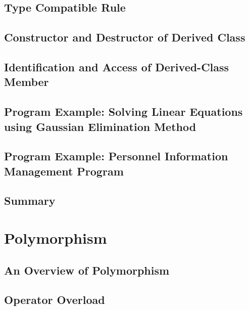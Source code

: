 \documentclass[a4paper]{article}
\begin{document}
\subsection{Type Compatible Rule}

\subsection{Constructor and Destructor of Derived Class}

\subsection{Identification and Access of Derived-Class Member}

\subsection{Program Example: Solving Linear Equations using Gaussian Elimination Method}

\subsection{Program Example: Personnel Information Management Program}

\subsection{Summary}

\newpage
\section{Polymorphism}
\subsection{An Overview of Polymorphism}

\subsection{Operator Overload}
\end{document}
